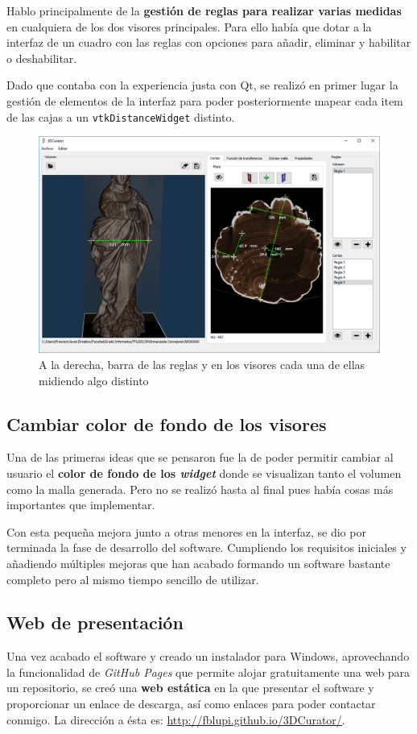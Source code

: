 Hablo principalmente de la \textbf{gestión de reglas para realizar varias medidas} en cualquiera de los dos visores principales. Para ello había que dotar a la interfaz de un cuadro con las reglas con opciones para añadir, eliminar y habilitar o deshabilitar.

Dado que contaba con la experiencia justa con Qt, se realizó en primer lugar la gestión de elementos de la interfaz para poder posteriormente mapear cada item de las cajas a un \texttt{vtkDistanceWidget} distinto.

\begin{figure}[H]
	\centering
	\includegraphics[width=12cm]{imagenes/varias_reglas}
	\caption{A la derecha, barra de las reglas y en los visores cada una de ellas midiendo algo distinto}
	\label{fig:varias_reglas}
\end{figure}

\subsection{Cambiar color de fondo de los visores}

Una de las primeras ideas que se pensaron fue la de poder permitir cambiar al usuario el \textbf{color de fondo de los \textit{widget}} donde se visualizan tanto el volumen como la malla generada. Pero no se realizó hasta al final pues había cosas más importantes que implementar.

Con esta pequeña mejora junto a otras menores en la interfaz, se dio por terminada la fase de desarrollo del software. Cumpliendo los requisitos iniciales y añadiendo múltiples mejoras que han acabado formando un software bastante completo pero al mismo tiempo sencillo de utilizar.

\subsection{Web de presentación}

Una vez acabado el software y creado un instalador para Windows, aprovechando la funcionalidad de \textit{GitHub Pages} que permite alojar gratuitamente una web para un repositorio, se creó una \textbf{web estática} en la que presentar el software y proporcionar un enlace de descarga, así como enlaces para poder contactar conmigo. La dirección a ésta es: \href{http://fblupi.github.io/3DCurator/}{http://fblupi.github.io/3DCurator/}.